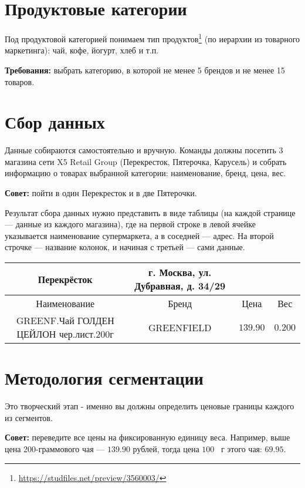 \documentclass[12pt, a4paper, oneside]{article}
\begin{document}
\section{Продуктовые категории}

Под продуктовой категорией понимаем тип продуктов\footnote{\url{https://studfiles.net/preview/3560003/}} (по иерархии из товарного маркетинга): чай, кофе, йогурт, хлеб и т.п.

 \textbf{Требования:} выбрать категорию, в которой не менее 5 брендов и не менее 15 товаров. 

\section{Сбор данных}

Данные собираются самостоятельно и вручную. Команды должны посетить $3$ магазина сети X5 Retail Group (Перекресток, Пятерочка, Карусель) и собрать информацию о товарах выбранной категории: наименование, бренд, цена, вес. 

 \textbf{Совет:} пойти в один Перекресток и в две Пятерочки.

Результат сбора данных нужно представить в виде таблицы (на каждой странице --- данные из каждого магазина), где на первой строке в левой ячейке указывается наименование супермаркета, а в соседней --- адрес.  На второй строчке --- название колонок, и начиная с третьей --- сами данные.


\begin{center}
	\begin{tabular}{|c|c|c|c|}
		\hline 
		Перекрёсток & г. Москва, ул. Дубравная, д. 34/29 &  &  \\ 
		\hline 
		Наименование & Бренд & Цена & Вес \\ 
		\hline 
		GREENF.Чай ГОЛДЕН ЦЕЙЛОН чер.лист.200г & 
		GREENFIELD
		& 
		$139.90$
		& $0.200$ \\ 
		\hline 
	\end{tabular} 
\end{center}



\section{Методология сегментации}	

Это творческий этап - именно вы должны определить ценовые границы каждого из сегментов. 

\textbf{Совет:} переведите все цены на фиксированную единицу веса.  Например, выше цена 200-граммового чая --- $139.90$ рублей, тогда цена $100$~ г этого чая: $69.95$.
\end{document}
